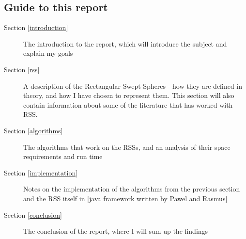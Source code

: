 \subsection{Guide to this report}
\begin{description}
\item[Section \ref{introduction}] The introduction to the report, which will introduce the subject and explain my goals
\item[Section \ref{rss}] A description of the Rectangular Swept Spheres - how they are defined in theory, and how I have chosen to represent them. This section will also contain information about some of the literature that has worked with RSS. 
\item[Section \ref{algorithms}] The algorithms that work on the RSSs, and an analysis of their space requirements and run time 
\item[Section \ref{implementation}] Notes on the implementation of the algorithms from the previous section and the RSS itself in [java framework written by Pawel and Rasmus] 
\item[Section \ref{conclusion}] The conclusion of the report, where I will sum up the findings  
\end{description}
